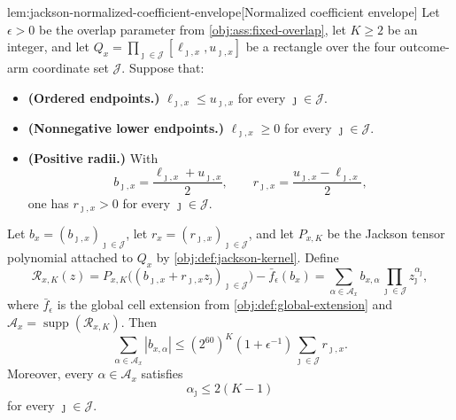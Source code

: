 \documentclass[11pt]{article}
\begin{document}
\begin{lemmav}{lem:jackson-normalized-coefficient-envelope}[Normalized coefficient envelope]
Let \(\epsilon>0\) be the overlap parameter from \cref{obj:ass:fixed-overlap}, let \(K\ge2\) be an integer, and let \(Q_x=\prod_{\jmath\in\mathcal J}[\ell_{\jmath,x},u_{\jmath,x}]\) be a rectangle over the four outcome-arm coordinate set \(\mathcal J\). Suppose that:
\begin{itemize}
\item \textbf{(Ordered endpoints.)} \(\ell_{\jmath,x}\le u_{\jmath,x}\) for every \(\jmath\in\mathcal J\).
\item \textbf{(Nonnegative lower endpoints.)} \(\ell_{\jmath,x}\ge0\) for every \(\jmath\in\mathcal J\).
\item \textbf{(Positive radii.)} With
\[
b_{\jmath,x}=\frac{\ell_{\jmath,x}+u_{\jmath,x}}{2},
\qquad
r_{\jmath,x}=\frac{u_{\jmath,x}-\ell_{\jmath,x}}{2},
\]
one has \(r_{\jmath,x}>0\) for every \(\jmath\in\mathcal J\).
\end{itemize}
Let \(b_x=(b_{\jmath,x})_{\jmath\in\mathcal J}\), let \(r_x=(r_{\jmath,x})_{\jmath\in\mathcal J}\), and let \(P_{x,K}\) be the Jackson tensor polynomial attached to \(Q_x\) by \cref{obj:def:jackson-kernel}. Define
\[
\mathcal R_{x,K}(z)
=
P_{x,K}\bigl((b_{\jmath,x}+r_{\jmath,x}z_\jmath)_{\jmath\in\mathcal J}\bigr)
-\bar f_\epsilon(b_x)
=
\sum_{\alpha\in\mathcal A_x} b_{x,\alpha}\prod_{\jmath\in\mathcal J} z_\jmath^{\alpha_\jmath},
\]
where \(\bar f_\epsilon\) is the global cell extension from \cref{obj:def:global-extension} and \(\mathcal A_x=\operatorname{supp}(\mathcal R_{x,K})\). Then
\[
\sum_{\alpha\in\mathcal A_x}|b_{x,\alpha}|
\le
(2^{60})^{K}(1+\epsilon^{-1})\sum_{\jmath\in\mathcal J}r_{\jmath,x}.
\]
Moreover, every \(\alpha\in\mathcal A_x\) satisfies
\[
\alpha_\jmath\le 2(K-1)
\]
for every \(\jmath\in\mathcal J\).
\end{lemmav}
\end{document}
